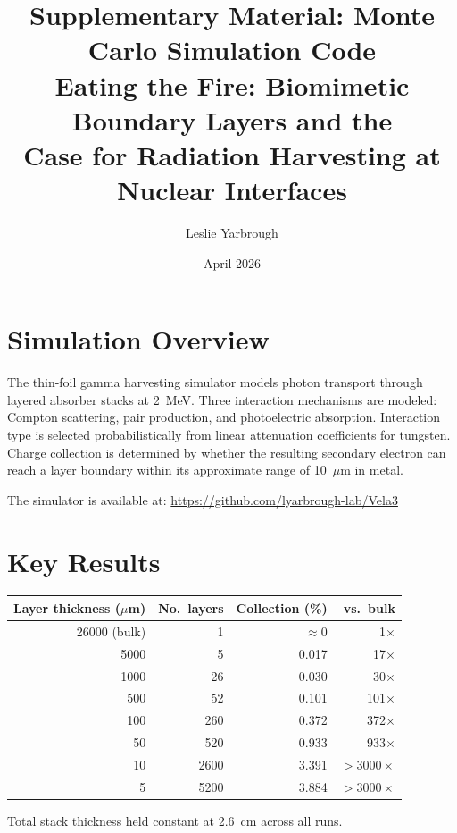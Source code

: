 \documentclass[11pt]{article}
\title{Supplementary Material: Monte Carlo Simulation Code\\
\large Eating the Fire: Biomimetic Boundary Layers and the\\
Case for Radiation Harvesting at Nuclear Interfaces}
\author{Leslie Yarbrough}
\date{April 2026}
\begin{document}
\maketitle

\section*{Simulation Overview}
The thin-foil gamma harvesting simulator models photon transport through
layered absorber stacks at 2~MeV. Three interaction mechanisms are modeled:
Compton scattering, pair production, and photoelectric absorption.
Interaction type is selected probabilistically from linear attenuation
coefficients for tungsten. Charge collection is determined by whether the
resulting secondary electron can reach a layer boundary within its
approximate range of 10~$\mu$m in metal.

The simulator is available at:
\url{https://github.com/lyarbrough-lab/Vela3}

\section*{Key Results}
\begin{center}
\begin{tabular}{rrrr}
\hline
Layer thickness ($\mu$m) & No.\ layers & Collection (\%) & vs.\ bulk \\
\hline
26000 (bulk) & 1    & $\approx 0$  & 1$\times$ \\
5000         & 5    & 0.017        & 17$\times$ \\
1000         & 26   & 0.030        & 30$\times$ \\
500          & 52   & 0.101        & 101$\times$ \\
100          & 260  & 0.372        & 372$\times$ \\
50           & 520  & 0.933        & 933$\times$ \\
10           & 2600 & 3.391        & $>3000\times$ \\
5            & 5200 & 3.884        & $>3000\times$ \\
\hline
\end{tabular}
\end{center}

Total stack thickness held constant at 2.6~cm across all runs.
\end{document}
